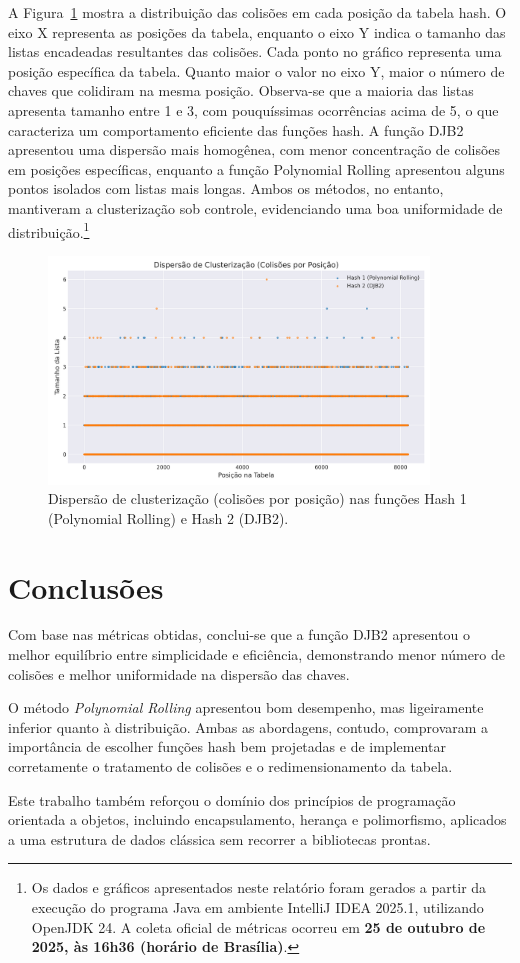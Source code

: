 \documentclass[12pt,a4paper]{abntex2}
\begin{document}
A Figura~\ref{fig:dispersao_cluster} mostra a distribuição das colisões em cada posição da tabela hash. O eixo X representa as posições da tabela, enquanto o eixo Y indica o tamanho das listas encadeadas resultantes das colisões.
Cada ponto no gráfico representa uma posição específica da tabela. Quanto maior o valor no eixo Y, maior o número de chaves que colidiram na mesma posição. Observa-se que a maioria das listas apresenta tamanho entre 1 e 3, com pouquíssimas ocorrências acima de 5, o que caracteriza um comportamento eficiente das funções hash.
A função DJB2 apresentou uma dispersão mais homogênea, com menor concentração de colisões em posições específicas, enquanto a função Polynomial Rolling apresentou alguns pontos isolados com listas mais longas. Ambos os métodos, no entanto, mantiveram a clusterização sob controle, evidenciando uma boa uniformidade de distribuição.\footnote{Os dados e gráficos apresentados neste relatório foram gerados a partir da execução do programa Java em ambiente IntelliJ IDEA 2025.1, utilizando OpenJDK 24. A coleta oficial de métricas ocorreu em \textbf{25 de outubro de 2025, às 16h36 (horário de Brasília)}.}

\begin{figure}[H]
  \centering
  \includegraphics[width=0.9\textwidth]{grafico_cluster_scatter.png}
  \caption{Dispersão de clusterização (colisões por posição) nas funções Hash 1 (Polynomial Rolling) e Hash 2 (DJB2).}
  \label{fig:dispersao_cluster}
\end{figure}

\newpage

\section{Conclusões}
Com base nas métricas obtidas, conclui-se que a função DJB2 apresentou o melhor equilíbrio entre simplicidade e eficiência, demonstrando menor número de colisões e melhor uniformidade na dispersão das chaves.

O método \textit{Polynomial Rolling} apresentou bom desempenho, mas ligeiramente inferior quanto à distribuição. Ambas as abordagens, contudo, comprovaram a importância de escolher funções hash bem projetadas e de implementar corretamente o tratamento de colisões e o redimensionamento da tabela.

Este trabalho também reforçou o domínio dos princípios de programação orientada a objetos, incluindo encapsulamento, herança e polimorfismo, aplicados a uma estrutura de dados clássica sem recorrer a bibliotecas prontas.
\end{document}

